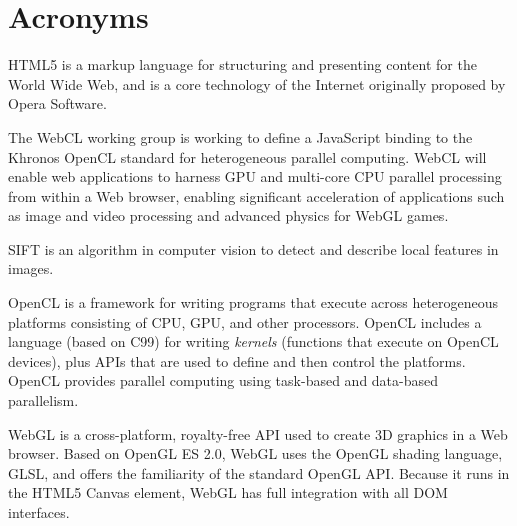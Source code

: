 \section*{Acronyms}
\begin{acronym}[WYSIWYG]

    {\small HTML5 is a markup language for structuring and presenting content for the World Wide Web,
    and is a core technology of the Internet originally proposed by Opera Software.\par}


    {\small The WebCL working group is working to define a JavaScript binding to the Khronos \ac{OpenCL}
    standard for heterogeneous parallel computing. WebCL will enable web applications to harness GPU and
    multi-core CPU parallel processing from within a Web browser, enabling significant acceleration of
    applications such as image and video processing and advanced physics for \ac{WebGL} games.\par}


    {\small SIFT is an algorithm in computer vision to detect and describe local features in images.\par}



    {\small OpenCL is a framework for writing programs that execute across heterogeneous platforms consisting
    of CPU, GPU, and other processors. OpenCL includes a language (based on C99) for writing \emph{kernels}
    (functions that execute on OpenCL devices), plus APIs that are used to define and then control the platforms.
    OpenCL provides parallel computing using task-based and data-based parallelism.\par}


    {\small WebGL is a cross-platform, royalty-free API used to create 3D graphics in a Web browser. Based on
    OpenGL ES 2.0, WebGL uses the OpenGL shading language, GLSL, and offers the familiarity of the standard OpenGL API.
    Because it runs in the HTML5 Canvas element, WebGL has full integration with all DOM interfaces.\par}



\end{acronym}
